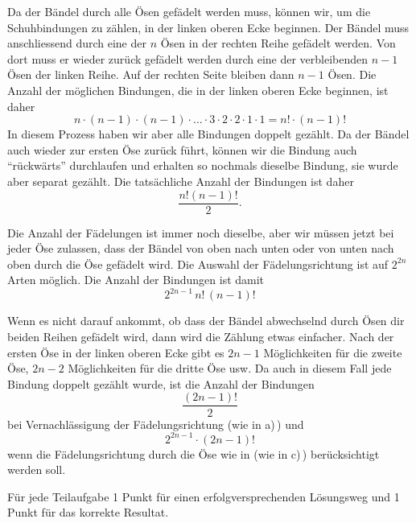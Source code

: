 \begin{loesung}
\begin{teilaufgaben}
\item
Da der Bändel durch alle Ösen gefädelt werden muss, können wir, um die
Schuhbindungen zu zählen, in der linken oberen Ecke beginnen.
Der Bändel muss anschliessend durch eine der $n$ Ösen in der rechten
Reihe gefädelt werden.
Von dort muss er wieder zurück gefädelt werden durch eine der
verbleibenden $n-1$ Ösen der linken Reihe.
Auf der rechten Seite bleiben dann $n-1$ Ösen.
Die Anzahl der möglichen Bindungen, die in der linken oberen Ecke beginnen,
ist daher
\[
n\cdot (n-1) \cdot (n-1) \cdot \dots \cdot 3\cdot 2 \cdot 2 \cdot 1 \cdot 1
=
n! \cdot (n-1)!
\]
In diesem Prozess haben wir aber alle Bindungen doppelt gezählt.
Da der Bändel auch wieder zur ersten Öse zurück führt, können wir die
Bindung auch ``rückwärts'' durchlaufen und erhalten so nochmals dieselbe
Bindung, sie wurde aber separat gezählt.
Die tatsächliche Anzahl der Bindungen ist daher
\[
\frac{n!(n-1)!}2.
\]
\item 
Die Anzahl der Fädelungen ist immer noch dieselbe, aber wir müssen
jetzt bei jeder Öse zulassen, dass der Bändel von oben nach unten
oder von unten nach oben durch die Öse gefädelt wird.
Die Auswahl der Fädelungsrichtung ist auf $2^{2n}$ Arten möglich.
Die Anzahl der Bindungen ist damit
\[
2^{2n-1}\, n!\, (n-1)!
\]
\item
Wenn es nicht darauf ankommt, ob dass der Bändel abwechselnd durch
Ösen dir beiden Reihen gefädelt wird, dann wird die Zählung etwas
einfacher.
Nach der ersten Öse in der linken oberen Ecke gibt es $2n-1$ Möglichkeiten
für die zweite Öse, $2n-2$ Möglichkeiten für die dritte Öse usw.
Da auch in diesem Fall jede Bindung doppelt gezählt wurde, ist
die Anzahl der Bindungen
\[
\frac{(2n-1)!}{2}
\] 
bei Vernachlässigung der Fädelungsrichtung (wie in a)\,) und
\[
2^{2n-1} \cdot (2n-1)!
\]
wenn die Fädelungsrichtung durch die Öse wie in (wie in c)\,)
berücksichtigt werden soll.
\qedhere
\end{teilaufgaben}
\end{loesung}

\begin{bewertung}
Für jede Teilaufgabe 1 Punkt für einen erfolgversprechenden Lösungsweg
und 1 Punkt für das korrekte Resultat.
\end{bewertung}

